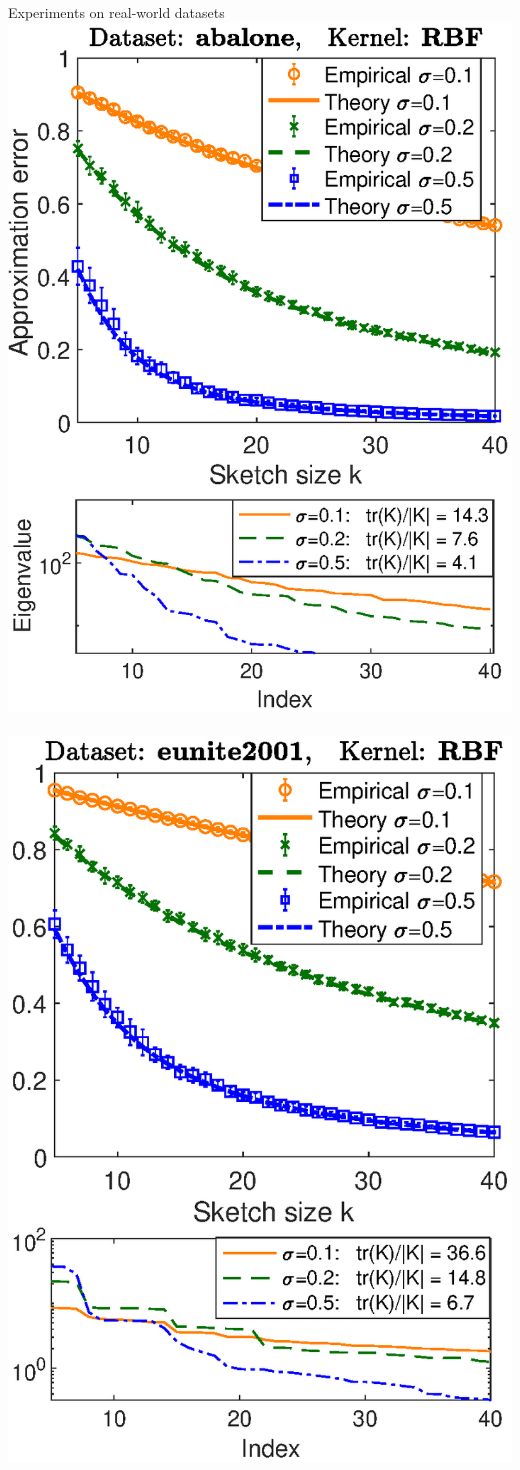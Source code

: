 \begin{frame}{Experiments on real-world datasets}
  \includegraphics[width=.495\textwidth]{Figures/projections/abalone-nystrom}~%
  \nobreak\includegraphics[width=.495\textwidth]{Figures/projections/eunite-nystrom}
\end{frame}
